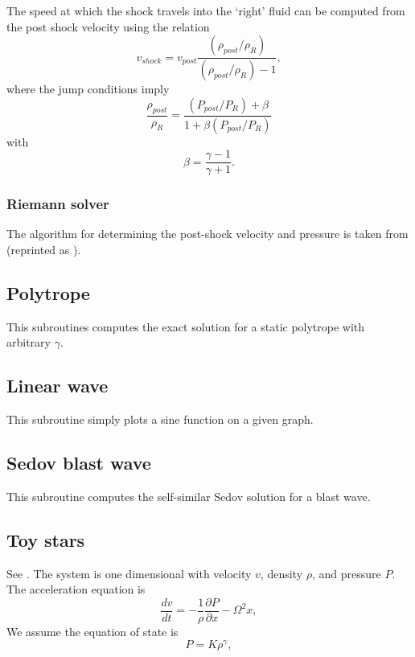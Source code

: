 \documentclass[a4paper,12pt]{article}
\begin{document}
 The speed at which the shock travels into the `right' fluid can be computed from the post shock
velocity using the relation
\begin{equation}
v_{shock} = v_{post}\frac{(\rho_{post}/\rho_R)}{(\rho_{post}/\rho_R)- 1},
\end{equation}
where the jump conditions imply
\begin{equation}
\frac{\rho_{post}}{\rho_R} = \frac{(P_{post}/P_R) + \beta}{1 + \beta (P_{post}/P_R)}
\end{equation}
with
\begin{equation}
\beta = \frac{\gamma - 1}{\gamma + 1}.
\end{equation}

\subsubsection{Riemann solver}
 The algorithm for determining the post-shock velocity and pressure is taken
from \citet{vanleer79} (reprinted as \citealt{vanleer99}).


\subsection{Polytrope}
 This subroutines computes the exact solution for a static polytrope with
arbitrary $\gamma$.

\subsection{Linear wave}
 This subroutine simply plots a sine function on a given graph.

\subsection{Sedov blast wave}
 This subroutine computes the self-similar Sedov solution for a blast wave.

\subsection{Toy stars}
 See \citet{mp04}. The system is one dimensional with velocity $v$, density $\rho$, and pressure
$P$. The acceleration equation is 
\begin{equation}
\frac{dv}{dt} = - \frac{1}{\rho} \frac{\partial P}{\partial x}  - \Omega^2 x,
\end{equation}
 We assume the equation of state is 
\begin{equation}
P = K \rho^\gamma,
\end{equation} 
\end{document}
